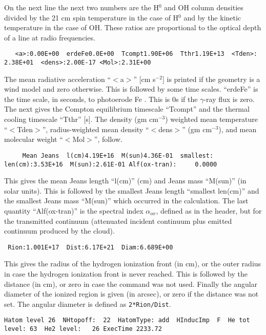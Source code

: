On the next line 
the next two numbers are the H$^0$ and OH column densities
divided by the 21 cm spin temperature in the case of H$^0$
and by the kinetic
temperature in the case of OH.
These ratios are proportional to the optical
depth of a line at radio frequencies.
{\setverbatimfontsize{\tiny}
\begin{verbatim}
   <a>:0.00E+00  erdeFe0.0E+00  Tcompt1.90E+06  Tthr1.19E+13  <Tden>: 2.38E+01  <dens>:2.00E-17 <Mol>:2.31E+00
\end{verbatim}
}

The mean radiative acceleration ``$<$a$>$'' [cm s$^{-2}$] is printed if the geometry
is a wind model and zero otherwise.
This is followed by some time scales.
``erdeFe'' is the time scale, in seconds, to photoerode Fe
\citep{Boyd1987}.
This is 0s if the  $\gamma$-ray flux is zero.
The next gives the Compton
equilibrium timescale ``Tcompt'' and the thermal
cooling timescale ``Tthr'' [s].
The density (gm cm$^{-3}$) weighted mean temperature ``$<$Tden$>$'',
radius-weighted mean density ``$<$dens$>$'' (gm cm$^{-3}$),
and mean molecular weight ``$<$Mol$>$'', follow.
{\setverbatimfontsize{\tiny}
\begin{verbatim}
     Mean Jeans  l(cm)4.19E+16  M(sun)4.36E-01  smallest:     len(cm):3.53E+16  M(sun):2.61E-01 Alf(ox-tran):     0.0000
\end{verbatim}
}
This gives the mean Jeans length ``l(cm)'' (cm) and Jeans mass ``M(sun)''
(in solar units).
This is followed by the smallest Jeans length ``smallest
len(cm)'' and the smallest Jeans mass ``M(sun)'' which occurred in the
calculation.
The last quantity ``Alf(ox-tran)'' is the spectral index
$\alpha_{ox}$,
defined as in the header,
but for the transmitted continuum (attenuated
incident continuum plus emitted continuum produced by the cloud).
{\setverbatimfontsize{\tiny}
\begin{verbatim}
 Rion:1.001E+17  Dist:6.17E+21  Diam:6.689E+00
\end{verbatim}
}
This gives the radius of the hydrogen ionization front (in cm), or the outer radius in case
the hydrogen ionization front is never reached. This is followed by the distance (in cm), or
zero in case the  command was not used. Finally the angular diameter of
the ionized region is given (in arcsec), or zero if the distance was not set. The angular diameter
is defined as {\tt 2*Rion/Dist}.
{\setverbatimfontsize{\tiny}
\begin{verbatim}
Hatom level 26  NHtopoff:  22  HatomType: add  HInducImp  F  He tot level: 63  He2 level:   26 ExecTime 2233.72
\end{verbatim}
}

